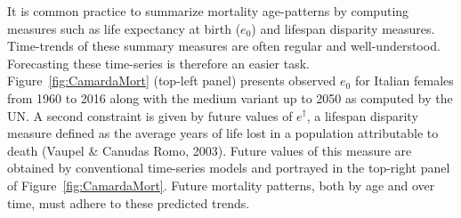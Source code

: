 \documentclass[twoside]{report}
\begin{document}
It is common practice to summarize mortality age-patterns by computing measures such as life expectancy at birth ($e_{0}$) and lifespan disparity measures. Time-trends of these summary measures are often regular and well-understood. Forecasting these time-series is therefore an easier task. Figure~\ref{fig:CamardaMort} (top-left panel) presents observed $e_{0}$ for Italian females from 1960 to 2016 along with the medium variant up to 2050 as computed by the UN. A second constraint is given by future values of $e^{\dagger}$, a lifespan disparity measure defined as the average years of life lost in a population attributable to death (Vaupel \& Canudas Romo, 2003). Future values of this measure are obtained by conventional time-series models and portrayed in the top-right panel of Figure~\ref{fig:CamardaMort}. Future mortality patterns, both by age and over time, must adhere to these predicted trends.
\end{document}
